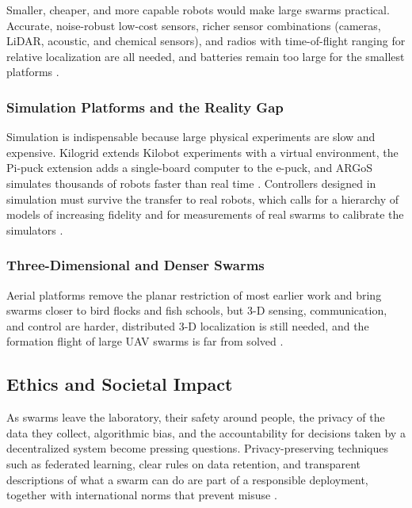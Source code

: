 Smaller, cheaper, and more capable robots would make large swarms practical.
Accurate, noise-robust low-cost sensors, richer sensor combinations (cameras,
LiDAR, acoustic, and chemical sensors), and radios with time-of-flight ranging
for relative localization are all needed, and batteries remain too large for the
smallest platforms \cite{kegeleirs2025towards,tan2013research}.

\subsubsection{Simulation Platforms and the Reality Gap}

Simulation is indispensable because large physical experiments are slow and
expensive. Kilogrid extends Kilobot experiments with a virtual environment, the
Pi-puck extension adds a single-board computer to the e-puck, and ARGoS
simulates thousands of robots faster than real time
\cite{dias2021swarm,kegeleirs2025towards}. Controllers designed in simulation
must survive the transfer to real robots, which calls for a hierarchy of models
of increasing fidelity and for measurements of real swarms to calibrate the
simulators \cite{kuckling2023recent,hamann2018swarm}.

\subsubsection{Three-Dimensional and Denser Swarms}

Aerial platforms remove the planar restriction of most earlier work and bring
swarms closer to bird flocks and fish schools, but 3-D sensing, communication,
and control are harder, distributed 3-D localization is still needed, and the
formation flight of large UAV swarms is far from solved
\cite{kushleyev2013towards,tan2013research}.

\subsection{Ethics and Societal Impact}

As swarms leave the laboratory, their safety around people, the privacy of the
data they collect, algorithmic bias, and the accountability for decisions taken
by a decentralized system become pressing questions. Privacy-preserving
techniques such as federated learning, clear rules on data retention, and
transparent descriptions of what a swarm can do are part of a responsible
deployment, together with international norms that prevent misuse
\cite{seebacher2025collective,bhowmick2024bio}.

